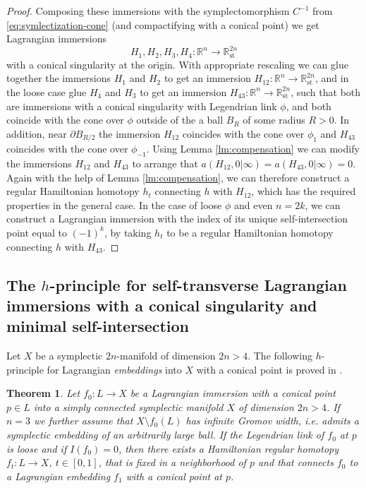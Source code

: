 \documentclass[reqno,11pt]{amsart}
\numberwithin{equation}{section}
\theoremstyle{my}
\theoremstyle{my}
\newtheorem{thm}{Theorem}[section]
\theoremstyle{your}
\newcommand{\R}{\mathbb{R}}
\newcommand{\st}{\mathrm{st}}
\newcommand{\p}{\partial }
\begin{document}
\begin{proof}
Composing these immersions with the symplectomorphism $C^{-1}$ from
 \eqref{eq:symlectization-cone}  (and compactifying  with a conical point) we get Lagrangian immersions
$$
H_1,H_2, H_3,H_4\colon\R^n\to\R^{2n}_\st
$$
with a conical singularity at the origin. With appropriate rescaling we can glue together the immersions
 $H_1$ and $H_2$  to get  an immersion $H_{12}\colon\R^n\to\R^{2n}_\st$, and in the loose case glue $H_4$ and $H_3$ to get  an immersion $H_{43}\colon\R^n\to\R^{2n}_\st$, such that
 both are immersions with a  conical singularity with Legendrian link $\phi$, and both coincide with the cone over $\phi$ outside of the a ball $B_R$ of some radius $R>0$. In addition, near $\p B_{R/2}$  
 the immersion  $H_{12}$ coincides with the cone over $\phi_1$ and 
 $H_{43}$ coincides with the cone over $\phi_{-1}$. 
{  Using Lemma \ref{lm:compensation} we can modify the immersions $H_{12}$ and $H_{43}$ to arrange that $a(H_{12},0|\infty)= 
a(H_{43},0|\infty)=0$. Again with the help of Lemma \ref{lm:compensation}, we can therefore construct a 
 regular Hamiltonian homotopy $h_t$  connecting $h$ with $H_{12}$, which has   the required properties in the general case.} In the case  of loose $\phi$ and even $n=2k$, we can construct a Lagrangian  immersion with the index of its unique self-intersection point equal to $(-1)^k$, by taking  $h_t$ to be a  regular Hamiltonian homotopy connecting $h$ with $H_{43}$.
\end{proof}
 
\subsection{The $h$-principle for self-transverse Lagrangian immersions with a conical singularity and minimal self-intersection}\label{sec:con-h}
Let $X$ be a symplectic $2n$-manifold of dimension $2n>4$. The following $h$-principle for Lagrangian {\it embeddings} into $X$ with a conical point is proved in \cite{EliMur}.
\begin{thm}\label{thm:caps-embedded}
Let $f_0\colon L\to X$ be a Lagrangian immersion with a conical point $p\in L$ into a  simply connected symplectic manifold $X$ of dimension $2n>4$. If $n=3$ we further   assume that $X\setminus 
f_0(L)$ has infinite Gromov width, i.e. admits a symplectic embedding of an arbitrarily large ball.
If the Legendrian link of $f_0$ at $p$ is loose and if $I(f_0)=0$, then there exists a Hamiltonian regular homotopy $f_t\colon L\to X$, $t\in [0,1]$, that is fixed in a neighborhood of $p$ and that connects $f_0$ to a Lagrangian embedding $f_1$ with a conical point at $p$.
\end{thm}
 
\end{document}

